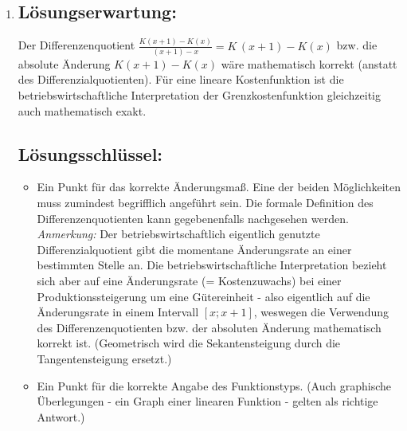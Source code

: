 \begin{langesbeispiel}
{\begin{enumerate}
	$\overline{K}=\frac{0,001\cdot x³-0,09\cdot x²+2,8x+5}{x}=0,001\cdot x²-0,09\cdot x+2,8+5\cdot x^{-1}$
	
	$\overline{K}(100)=3,85$
 	
	\subsection{Lösungsschlüssel:}
	\begin{itemize}
		\item  Ein Ausgleichspunkt für die korrekte Stückkostenfunktion, wobei der Funktionsterm nicht vereinfacht werden muss. 
		\item  Ein Punkt für die korrekte Berechnung des Funktionswertes (sollte die Stückkostenfunktion zwar im Ansatz richtig, aber in der Vereinfachung fehlerhaft berechnet worden sein, jedoch der Funktionswert dann korrekt berechnet worden sein, ist dieser Punkt zu geben).
	\end{itemize}
	
	\item \subsection{Lösungserwartung:}
		Der Differenzenquotient $\frac{K(x+1)-K(x)}{(x+1)-x}=K\,(x+1)-K(x)$ bzw. die absolute Änderung $K(x+1)-K(x)$ wäre mathematisch korrekt (anstatt des Differenzialquotienten). Für eine lineare Kostenfunktion ist die betriebswirtschaftliche Interpretation der Grenzkostenfunktion gleichzeitig auch mathematisch exakt.
		
	\subsection{Lösungsschlüssel:}
	
\begin{itemize}
	\item   Ein Punkt für das korrekte Änderungsmaß. Eine der beiden Möglichkeiten muss zumindest begrifflich angeführt sein. Die formale Definition des Differenzenquotienten kann gegebenenfalls nachgesehen werden.\\ 
\textit{Anmerkung:} Der betriebswirtschaftlich eigentlich genutzte Differenzialquotient gibt die momentane Änderungsrate an einer bestimmten Stelle an. Die betriebswirtschaftliche Interpretation bezieht sich aber auf eine Änderungsrate (= Kostenzuwachs) bei einer Produktionssteigerung um eine Gütereinheit - also eigentlich auf die Änderungsrate in einem Intervall $[x; x + 1]$, weswegen die Verwendung des Differenzenquotienten bzw. der absoluten Änderung mathematisch korrekt ist. (Geometrisch wird die Sekantensteigung durch die Tangentensteigung ersetzt.)
\item  Ein Punkt für die korrekte Angabe des Funktionstyps. (Auch graphische Überlegungen - ein Graph einer linearen Funktion - gelten als richtige Antwort.)
\end{itemize}
\end{enumerate}}
		\end{langesbeispiel}